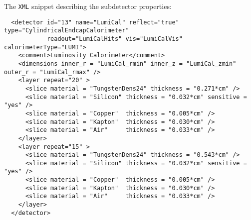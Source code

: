 The \texttt{XML} snippet describing the subdetector properties:
\begin{verbatim}
  <detector id="13" name="LumiCal" reflect="true" type="CylindricalEndcapCalorimeter" 
            readout="LumiCalHits" vis="LumiCalVis" calorimeterType="LUMI">
    <comment>Luminosity Calorimeter</comment>
    <dimensions inner_r = "LumiCal_rmin" inner_z = "LumiCal_zmin" outer_r = "LumiCal_rmax" />
    <layer repeat="20" >
      <slice material = "TungstenDens24" thickness = "0.271*cm" />
      <slice material = "Silicon" thickness = "0.032*cm" sensitive = "yes" />
      <slice material = "Copper"  thickness = "0.005*cm" />
      <slice material = "Kapton"  thickness = "0.030*cm" />
      <slice material = "Air"     thickness = "0.033*cm" />
    </layer>
    <layer repeat="15" >
      <slice material = "TungstenDens24" thickness = "0.543*cm" />
      <slice material = "Silicon" thickness = "0.032*cm" sensitive = "yes" />
      <slice material = "Copper"  thickness = "0.005*cm" />
      <slice material = "Kapton"  thickness = "0.030*cm" />
      <slice material = "Air"     thickness = "0.033*cm" />
    </layer>
  </detector>
\end{verbatim}

